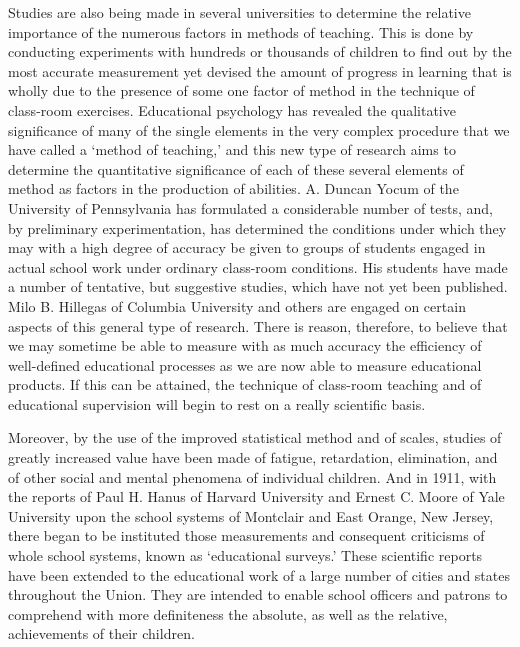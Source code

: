 \documentclass[
]{book}
\begin{document}
Studies are also being made in several universities to determine the relative importance of the numerous factors in methods of teaching. This is done by conducting experiments with hundreds or thousands of children to find out by the most accurate measurement yet devised the amount of progress in learning that is wholly due to the presence of some one factor of method in the technique of class-room exercises. Educational psychology has revealed the qualitative significance of many of the single elements in the very complex procedure that we have called a `method of teaching,' and this new type of research aims to determine the quantitative significance of each of these several elements of method as factors in the production of abilities. A. Duncan Yocum of the University of Pennsylvania has formulated a considerable number of tests, and, by preliminary experimentation, has determined the conditions under which they may with a high degree of accuracy be given to groups of students engaged in actual school work under ordinary class-room conditions. His students have made a number of tentative, but suggestive studies, which have not yet been published. Milo B. Hillegas of Columbia University and others are engaged on certain aspects of this general type of research. There is reason, therefore, to believe that we may sometime be able to measure with as much accuracy the efficiency of well-defined educational processes as we are now able to measure educational products. If this can be attained, the technique of class-room teaching and of educational supervision will begin to rest on a really scientific basis.

Moreover, by the use of the improved statistical method and of scales, studies of greatly increased value have been made of fatigue, retardation, elimination, and of other social and mental phenomena of individual children. And in 1911, with the reports of Paul H. Hanus of Harvard University and Ernest C. Moore of Yale University upon the school systems of Montclair and East Orange, New Jersey, there began to be instituted those measurements and consequent criticisms of whole school systems, known as `educational surveys.' These scientific reports have been extended to the educational work of a large number of cities and states throughout the Union. They are intended to enable school officers and patrons to comprehend with more definiteness the absolute, as well as the relative, achievements of their children.
\end{document}

